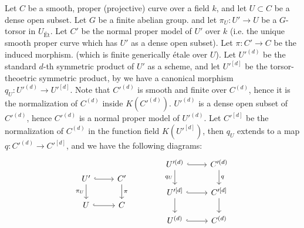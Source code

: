 Let $C$ be a smooth, proper (projective) curve over a field $k$, and let $U \subset C$ be a dense open subset.
Let $G$ be a finite abelian group. and let $\pi_U: U' \to U$ be a $G$-torsor in $U_{\text{\'Et}}$. 
Let $C'$ be the normal proper model of $U'$ over $k$ (i.e. the unique smooth proper curve which has $U'$ as a dense open subset).
Let $\pi: C' \to C$ be the induced morphism. (which is finite generically \'etale over $U$). 
Let $U'^{(d)}$ be the standard $d$-th symmetric product of $U'$ as a scheme, and let $U'^{[d]}$ be the torsor-theoetric symmetric product,
by  we have a canonical morphism $q_U: U'^{(d)} \to U'^{[d]}$.
Note that $C'^{(d)}$ is smooth and finite over $C^{(d)}$, hence it is the normalization of $C^{(d)}$ inside $K(C'^{(d)})$.
$U'^{(d)}$ is a dense open subset of $C'^{(d)}$, hence $C'^{(d)}$ is a normal proper model of $U'^{(d)}$.
Let $C'^{[d]}$ be the normalization of $C^{(d)}$ in the function field $K(U'^{[d]})$,
then $q_U$ extends to a map $q: C'^{(d)} \to C'^{[d]}$, and we have the following diagrams:
\[
\begin{tikzcd}
	U' \arrow[r, hook] \arrow[d, "\pi_U"'] & C' \arrow[d, "\pi"] \\
	U \arrow[r, hook] & C
\end{tikzcd}
\qquad \qquad
\begin{tikzcd}
	{U'^{(d)}} \arrow[r, hook] \arrow[d, "q_U"'] & {C'^{(d)}} \arrow[d, "q"] \\
	{U'^{[d]}} \arrow[r, hook] \arrow[d] & {C'^{[d]}} \arrow[d] \\
	{U^{(d)}} \arrow[r, hook] & {C^{(d)}}
\end{tikzcd}
\]

